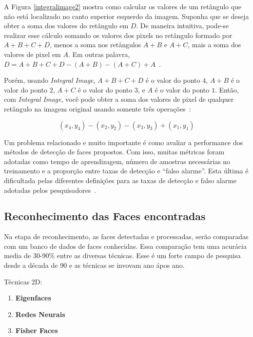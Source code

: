 A Figura \ref{integralimage2} mostra como calcular os valores de um retângulo que não está localizado no canto superior esquerdo da imagem. Suponha que se deseja obter a soma dos valores do retângulo em $\displaystyle D$. De maneira intuitiva, pode-se realizar esse cálculo somando os valores dos pixels no retângulo formado por $\displaystyle A+B+C+D$, menos a soma nos retângulos $\displaystyle A+B$ e $\displaystyle A+C$, mais a soma dos valores de pixel em $\displaystyle A$. Em outras palavra, $\displaystyle D = A+B+C+D-(A+B)-(A+C)+A$~\cite{servodetection, violajones}.

Porém, usando \textit{Integral Image}, $\displaystyle A+B+C+D$ é o valor do ponto $\displaystyle 4$, $\displaystyle A+B$ é o valor do ponto $\displaystyle 2$, $\displaystyle A+C$ é o valor do ponto $\displaystyle 3$, e $\displaystyle A$ é o valor do ponto $\displaystyle 1$. Então, com \textit{Integral Image}, você pode obter a soma dos valores de pixel de qualquer retângulo na imagem original usando somente três operações~\cite{servodetection, violajones}:

	\begin{equation}
		(x_4,y_4) - (x_2,y_2) - (x_3,y_3) + (x_1,y_1)
		\label{equacaointegralimage}
	\end{equation} 


Um problema relacionado e muito importante é como avaliar a performance dos métodos de detecção de faces propostos. Com isso, muitas métricas foram adotadas como tempo de aprendizagem, número de amostras necessárias no treinamento e a proporção entre taxas de detecção e ``falso alarme''. Esta última é dificultada pelas diferentes definições para as taxas de detecção e falso alarme adotadas pelos pesquisadores~\cite{yang}.


\subsection{Reconhecimento das Faces encontradas}

Na etapa de reconhecimento, as faces detectadas e processadas, serão comparadas com um banco de dados de faces conhecidas. Essa comparação tem uma acurácia media de 30-90\% entre as diversas técnicas. Esse é um forte campo de pesquisa desde a década de 90 e as técnicas se invovam ano ápos ano.

	Técnicas 2D:
	\begin{enumerate}
		\item \textbf{Eigenfaces}
		\item \textbf{Redes Neurais}
		\item \textbf{Fisher Faces}
	\end{enumerate}

